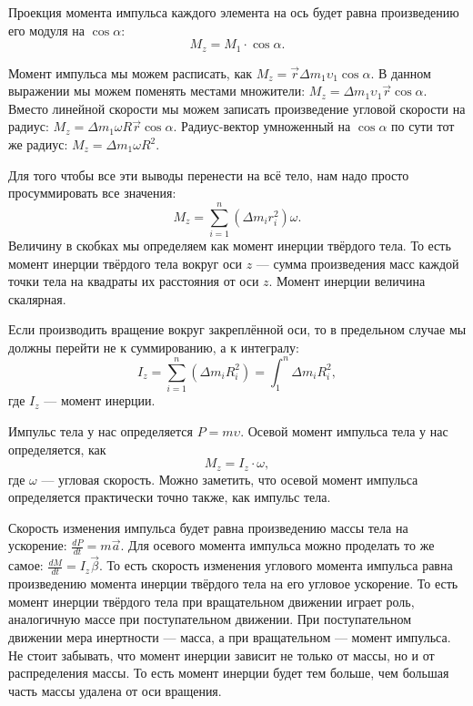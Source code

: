 \documentclass[10pt]{extbook}
\begin{document}
Проекция момента импульса каждого элемента на ось будет равна произведению его
модуля на \( \cos \alpha \): \[
	M_z = M_1 \cdot \cos \alpha
	.\]

Момент импульса мы можем расписать, как \( M_z = \vec{r} \Delta m_1 \upsilon_1
\cos \alpha \). В данном выражении мы можем поменять местами множители: \( M_z
= \Delta m_1 \upsilon_1 \vec{r} \cos \alpha \). Вместо линейной скорости мы
можем записать произведение угловой скорости на радиус: \( M_z = \Delta m_1
\omega R \vec{r} \cos \alpha \). Радиус-вектор умноженный на $\cos \alpha$ по
сути тот же радиус: \( M_z = \Delta m_1 \omega R^2 \).

Для того чтобы все эти выводы перенести на всё тело, нам надо просто
просуммировать все значения: \[
	M_z = \sum_{i=1}^{n} (\Delta m_i r_i^2) \omega
	.\] Величину в скобках мы определяем как момент инерции твёрдого тела. То
есть момент инерции твёрдого тела вокруг оси $z$ --- сумма произведения масс
каждой точки тела на квадраты их расстояния от оси $z$. Момент инерции
величина скалярная.

Если производить вращение вокруг закреплённой оси, то в предельном случае мы
должны перейти не к суммированию, а к интегралу: \[
	I_z = \sum_{i=1}^{n} (\Delta m_i R_i^2) = \int_{{1}}^{{n}} {\Delta m_i R_i^2}
	,\] где $I_z$ --- момент инерции.

Импульс тела у нас определяется \( P = m \upsilon \). Осевой момент импульса
тела у нас определяется, как \[
	M_z = I_z \cdot \omega
	,\] где $\omega$ --- угловая скорость. Можно заметить, что осевой момент
импульса определяется практически точно также, как импульс тела.

Скорость изменения импульса будет равна произведению массы тела на ускорение:
\( \frac{d P}{d t} = m \vec{a} \). Для осевого момента импульса можно проделать
то же самое: \( \frac{d M}{d t} = I_z \vec{\beta} \). То есть скорость
изменения углового момента импульса равна произведению момента инерции твёрдого
тела на его угловое ускорение. То есть момент инерции твёрдого тела при
вращательном движении играет роль, аналогичную массе при поступательном
движении. При поступательном движении мера инертности --- масса, а при
вращательном --- момент импульса. Не стоит забывать, что момент инерции зависит
не только от массы, но и от распределения массы. То есть момент инерции будет
тем больше, чем большая часть массы удалена от оси вращения.
\end{document}
